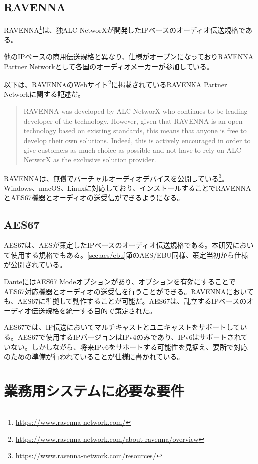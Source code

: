 \subsection{RAVENNA}

RAVENNA\footnote{\url{https://www.ravenna-network.com/}}は、独ALC NetworXが開発したIPベースのオーディオ伝送規格である。

他のIPベースの商用伝送規格と異なり、仕様がオープンになっておりRAVENNA Partner Networkとして各国のオーディオメーカーが参加している。

以下は、RAVENNAのWebサイト\footnote{\url{https://www.ravenna-network.com/about-ravenna/overview}}に掲載されているRAVENNA Partner Networkに関する記述だ。

\begin{quotation}
  RAVENNA was developed by ALC NetworX who continues to be leading developer of the technology. However, given that RAVENNA is an open technology based on existing standards, this means that anyone is free to develop their own solutions. Indeed, this is actively encouraged in order to give customers as much choice as possible and not have to rely on ALC NetworX as the exclusive solution provider.
\end{quotation}

RAVENNAは、無償でバーチャルオーディオデバイスを公開している\footnote{\url{https://www.ravenna-network.com/resources/}}。Windows、macOS、Linuxに対応しており、インストールすることでRAVENNAとAES67機器とオーディオの送受信ができるようになる。

\subsection{AES67}

AES67は、AESが策定したIPベースのオーディオ伝送規格である。本研究において使用する規格でもある。\ref{sec:aes/ebu}節のAES/EBU同様、策定当初から仕様が公開されている。

DanteにはAES67 Modeオプションがあり、オプションを有効にすることでAES67対応機器とオーディオの送受信を行うことができる。RAVENNAにおいても、AES67に準拠して動作することが可能だ。AES67は、乱立するIPベースのオーディオ伝送規格を統一する目的で策定された。

AES67では、IP伝送においてマルチキャストとユニキャストをサポートしている。AES67で使用するIPバージョンはIPv4のみであり、IPv6はサポートされていない。しかしながら、将来IPv6をサポートする可能性を見据え、要所で対応のための準備が行われていることが仕様に書かれている。

\section{業務用システムに必要な要件}
\label{sec:pro_audio_requirement}


